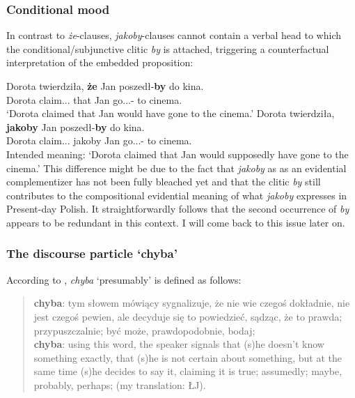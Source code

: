\documentclass[output=paper
,modfonts
,nonflat]{langsci/langscibook}
\begin{document}
\subsubsection{Conditional mood}
In contrast to \emph{że}-clauses, \emph{jakoby}-clauses cannot contain a verbal head to which the conditional\slash subjunctive clitic \emph{by} is attached, triggering a counterfactual interpretation of the embedded proposition:          
 
 \ea \ea \gll	Dorota twierdziła, \textbf{że} Jan poszedł-\textbf{by} do kina.\\
 		Dorota claim.{\lptcp}.{\sg}.{\fem} that Jan go.{\lptcp}.{\sg}.{\masc}-{\subj} to cinema.{\gen}\\
		\glt`Dorota claimed that Jan would have gone to the cinema.' 
		\ex\gll		*Dorota twierdziła, \textbf{jakoby} Jan poszedł-\textbf{by} do kina. \\
 			Dorota claim.{\lptcp}.{\sg}.{\fem} jakoby Jan go.{\lptcp}.{\sg}.{\masc}-{\subj} to cinema.{\gen} \\
		\glt Intended meaning: `Dorota claimed that Jan would supposedly have gone to the cinema.' 	
\z\z
This difference might be due to the fact that \emph{jakoby} as as an evidential complementizer has not been fully bleached yet and that the clitic \emph{by} still contributes to the compositional evidential meaning of what \emph{jakoby} expresses in Present-day Polish. It straightforwardly follows that the second occurrence of \emph{by} appears to be redundant in this context. I will come back to this issue later on. 

\subsubsection{The discourse particle `chyba'}
According to \textcite{SWJP1998}, \emph{chyba} `presumably' is defined as follows:

\begin{quote}
\textbf{chyba}: tym słowem mówiący sygnalizuje, że nie wie czegoś dokładnie, nie jest czegoś pewien, ale decyduje się to powiedzieć, sądząc, że to prawda; przypuszczalnie; być może, prawdopodobnie, bodaj; \\ \textbf{chyba}: using this word, the speaker signals that (s)he doesn't know something exactly, that (s)he is not certain about something, but at the same time (s)he decides to say it, claiming it is true; assumedly; maybe, probably, perhaps;  (my translation: ŁJ).  \newline \textcite[117]{SWJP1998}
\end{quote}
\end{document}
